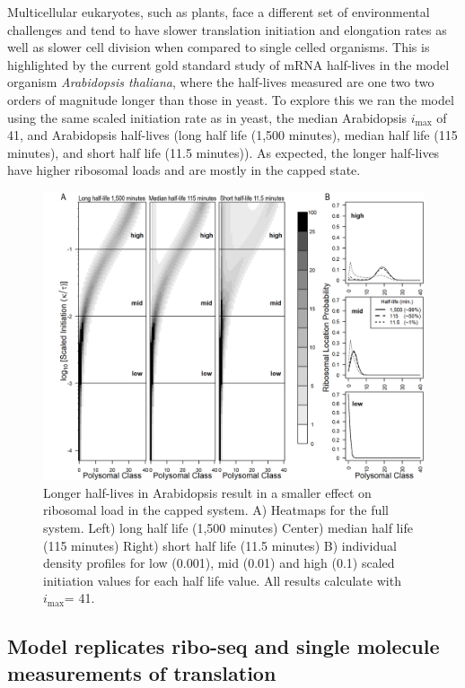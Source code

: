 \documentclass[review]{elsarticle}
\newcommand{\imax}{\ensuremath{{i_{\max}}}\xspace}
\begin{document}
Multicellular eukaryotes, such as plants, face a different set of environmental challenges and tend to have slower translation initiation and elongation rates as well as slower cell division when compared to single celled organisms. This is highlighted by the current gold standard study of mRNA half-lives in the model organism \textit{Arabidopsis thaliana}, where the half-lives measured are one two two orders of magnitude longer than those in yeast. To explore this we ran the model using the same scaled initiation rate as in yeast, the median Arabidopsis \imax of 41, and Arabidopsis half-lives (long half life (1,500 minutes), median half life (115 minutes), and short half life (11.5  minutes)). As expected, the longer half-lives have higher ribosomal loads and are mostly in the capped state.

\begin{figure}[!ht]
\centering
\includegraphics[width=120mm]{Images/2023-07-09_Figure2_At_Marking_Rate_range_medianlength_with_labels.png}
\caption{Longer half-lives in Arabidopsis result in a smaller effect on ribosomal load in the capped system.  A)  Heatmaps for the full system. Left) long half life (1,500 minutes) Center) median half life (115 minutes) Right) short half life (11.5  minutes)  B) individual density profiles for low (0.001), mid (0.01) and high (0.1) scaled initiation values for each half life value. All results calculate with \imax = 41.}
\end{figure}
\clearpage

\subsection{Model replicates ribo-seq and single molecule measurements of translation}
\end{document}
